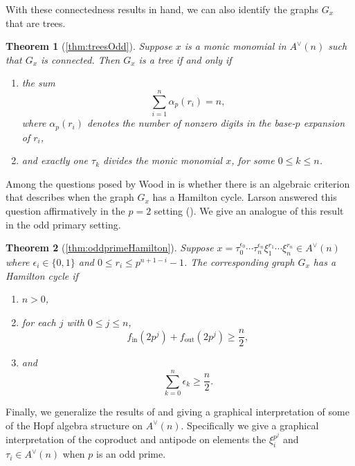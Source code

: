 \documentclass{amsart}
\newtheorem*{thm*}{Theorem}
\theoremstyle{definition}
\theoremstyle{plain}
\numberwithin{theorem}{section}
\numberwithin{equation}{section}
\numberwithin{figure}{section}
\DeclareMathOperator{\out}{out}
\DeclareMathOperator{\inn}{in}
\newcommand{\0}{\langle 0 \rangle }
\begin{document}
With these connectedness results in hand, we can also identify the graphs $G_x$ that are trees.

\begin{thm*}[\cref{thm:treesOdd}]
    Suppose $x$ is a monic monomial in $A^\vee(n)$ such that $G_x$ is connected. Then $G_x$ is a tree if and only if
   \begin{enumerate}
       \item the sum \[
            \sum_{i=1}^{n} \alpha_p(r_i) = n,
            \]
            where \( \alpha_p(r_i) \) denotes the number of nonzero digits in the base-\(p\) expansion of \( r_i \), 
            \item and exactly one \( \tau_k \) divides the monic monomial \( x \), for some \( 0 \leq k \leq n \).
   \end{enumerate}
\end{thm*}

Among the questions posed by Wood in \cite[]{Wood98} is whether there is an algebraic criterion that describes when the graph $G_x$ has a Hamilton cycle. Larson answered this question affirmatively in the $p = 2$ setting (\cite[Theorem 1.4]{Larson22}). We give an analogue of this result in the odd primary setting.
\begin{thm*}[\cref{thm:oddprimeHamilton}]
    Suppose $x = \tau_0^{\epsilon_0} \cdots \tau_n^{\epsilon_n} \xi_1^{r_1} \cdots \xi_n^{r_n} \in A^\vee(n)$ where $\epsilon_i \in \{0,1\}$ and $0 \leq r_i \leq p^{n + 1 - i} - 1$. The corresponding graph $G_x$ has a Hamilton cycle if
    \begin{enumerate}
        \item $n>0$,
        \item for each $j$ with $0 \leq j \leq n$,
        \[
            f_{\inn}(2p^j) + f_{\out} (2p^j) \geq         \frac{n}{2}, 
        \]
        \item and \[\sum_{k=0}^n  \epsilon_k \geq \frac{n}{2}.\]
    \end{enumerate}  
\end{thm*}

Finally, we generalize the results of \cite{Yearwood19} and \cite{Larson22} giving a graphical interpretation of some of the Hopf algebra structure on $A^\vee(n)$. Specifically we give a graphical interpretation of the coproduct and antipode on elements the $\xi_i^{p^j}$ and $\tau_i \in A^\vee (n)$ when $p$ is an odd prime. 
\end{document}
